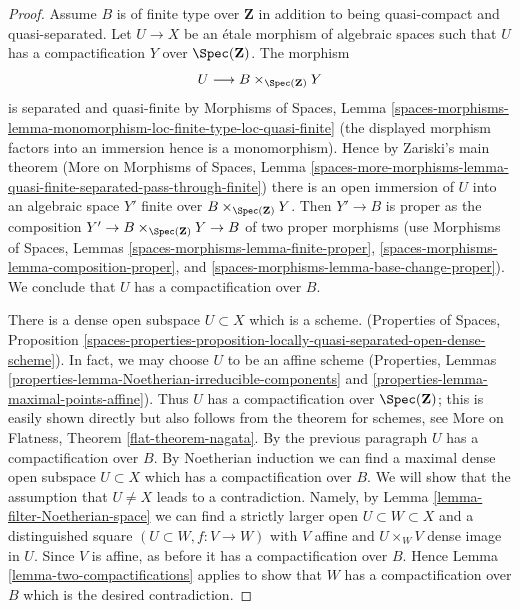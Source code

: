 \begin{proof}
\medskip\noindent
Assume $B$ is of finite type over $\mathbf{Z}$ in addition to being
quasi-compact and quasi-separated. Let $U \to X$ be an \'etale
morphism of algebraic spaces such that $U$ has a compactification
$Y$ over $\Spec(\mathbf{Z})$. The morphism
$$
U \longrightarrow B \times_{\Spec(\mathbf{Z})} Y
$$
is separated and quasi-finite by Morphisms of Spaces, Lemma
\ref{spaces-morphisms-lemma-monomorphism-loc-finite-type-loc-quasi-finite}
(the displayed morphism factors into an immersion hence is a monomorphism).
Hence by Zariski's main theorem (More on Morphisms of Spaces, Lemma
\ref{spaces-more-morphisms-lemma-quasi-finite-separated-pass-through-finite})
there is an open immersion of $U$ into an algebraic space $Y'$
finite over $B \times_{\Spec(\mathbf{Z})} Y$. Then $Y' \to B$ is proper
as the composition $Y' \to B \times_{\Spec(\mathbf{Z})} Y \to B$
of two proper morphisms
(use Morphisms of Spaces, Lemmas \ref{spaces-morphisms-lemma-finite-proper},
\ref{spaces-morphisms-lemma-composition-proper}, and
\ref{spaces-morphisms-lemma-base-change-proper}).
We conclude that $U$ has a compactification over $B$.

\medskip\noindent
There is a dense open subspace $U \subset X$ which is a scheme.
(Properties of Spaces, Proposition
\ref{spaces-properties-proposition-locally-quasi-separated-open-dense-scheme}).
In fact, we may choose $U$ to be an affine scheme
(Properties, Lemmas \ref{properties-lemma-Noetherian-irreducible-components}
and \ref{properties-lemma-maximal-points-affine}).
Thus $U$ has a compactification over $\Spec(\mathbf{Z})$;
this is easily shown directly but also follows from the
theorem for schemes, see
More on Flatness, Theorem \ref{flat-theorem-nagata}.
By the previous paragraph $U$ has a compactification over $B$. 
By Noetherian induction we can find a maximal dense open subspace
$U \subset X$ which has a compactification over $B$. We will show
that the assumption that $U \not = X$ leads to a contradiction.
Namely, by Lemma \ref{lemma-filter-Noetherian-space}
we can find a strictly larger open $U \subset W \subset X$
and a distinguished square $(U \subset W, f : V \to W)$
with $V$ affine and $U \times_W V$ dense image in $U$.
Since $V$ is affine, as before it has a compactification over $B$. Hence
Lemma \ref{lemma-two-compactifications}
applies to show that $W$ has a compactification over $B$
which is the desired contradiction.
\end{proof}
